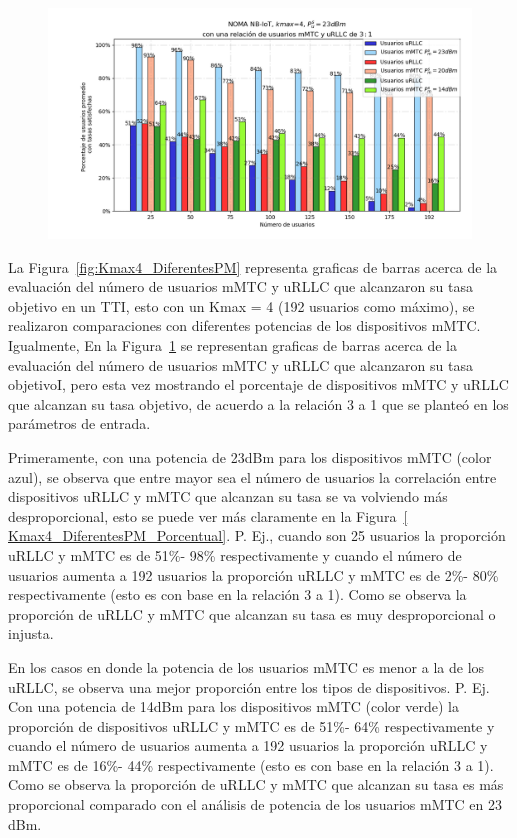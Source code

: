 \begin{figure}[th]
    \centering
    \includegraphics[scale=.6]{Figures/ResultadosNOMA/Kmax4_DiferentesPM_Porcentual.png}
    \decoRule
    \caption[]{}
    \label{fig:Kmax4_DiferentesPM_Porcentual}
\end{figure}


La Figura~\ref{fig:Kmax4_DiferentesPM} representa graficas de barras acerca de la evaluación del número de usuarios mMTC y uRLLC que alcanzaron su tasa objetivo en un TTI, esto con un Kmax = 4 (192 usuarios como máximo), se realizaron comparaciones con diferentes potencias de los dispositivos mMTC. Igualmente, En la Figura~\ref{fig:Kmax4_DiferentesPM_Porcentual} se representan graficas de barras acerca de la evaluación del número de usuarios mMTC y uRLLC que alcanzaron su tasa objetivoI, pero esta vez mostrando el porcentaje de dispositivos mMTC y uRLLC que alcanzan su tasa objetivo, de acuerdo a la relación 3 a 1 que se planteó en los parámetros de entrada.\newline

Primeramente, con una potencia de 23dBm para los dispositivos mMTC (color azul), se observa que entre mayor sea el número de usuarios la correlación entre dispositivos uRLLC y mMTC que alcanzan su tasa se va volviendo más desproporcional, esto se puede ver más claramente en la Figura~\ref{ Kmax4_DiferentesPM_Porcentual}. P. Ej., cuando son 25 usuarios la proporción uRLLC y mMTC es de 51\%- 98\% respectivamente y cuando el número de usuarios aumenta a 192 usuarios la proporción uRLLC y mMTC es de 2\%- 80\% respectivamente (esto es con base en la relación 3 a 1). Como se observa la proporción de uRLLC y mMTC que alcanzan su tasa es muy desproporcional o injusta.\newline

En los casos en donde la potencia de los usuarios mMTC es menor a la de los uRLLC, se observa una mejor proporción entre los tipos de dispositivos. P. Ej. Con una potencia de 14dBm para los dispositivos mMTC (color verde) la proporción de dispositivos uRLLC y mMTC es de 51\%- 64\% respectivamente y cuando el número de usuarios aumenta a 192 usuarios la proporción uRLLC y mMTC es de 16\%- 44\% respectivamente (esto es con base en la relación 3 a 1). Como se observa la proporción de uRLLC y mMTC que alcanzan su tasa es más proporcional comparado con el análisis de potencia de los usuarios mMTC en 23 dBm. \newline


